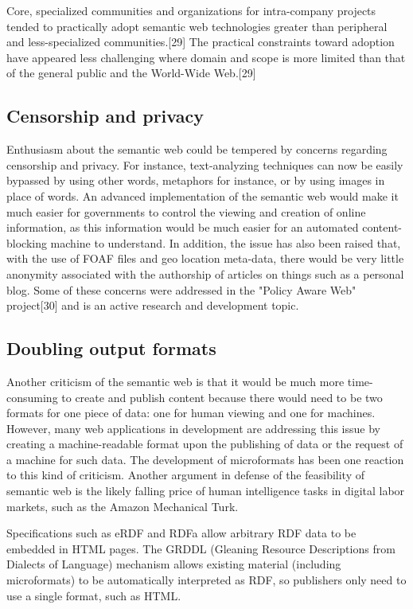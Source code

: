 Core, specialized communities and organizations for intra-company projects tended to practically adopt semantic web technologies greater than peripheral and less-specialized communities.[29] The practical constraints toward adoption have appeared less challenging where domain and scope is more limited than that of the general public and the World-Wide Web.[29]


\subsection{Censorship and privacy}

Enthusiasm about the semantic web could be tempered by concerns regarding censorship and privacy. For instance, text-analyzing techniques can now be easily bypassed by using other words, metaphors for instance, or by using images in place of words. An advanced implementation of the semantic web would make it much easier for governments to control the viewing and creation of online information, as this information would be much easier for an automated content-blocking machine to understand. In addition, the issue has also been raised that, with the use of FOAF files and geo location meta-data, there would be very little anonymity associated with the authorship of articles on things such as a personal blog. Some of these concerns were addressed in the "Policy Aware Web" project[30] and is an active research and development topic.

\subsection{Doubling output formats}

Another criticism of the semantic web is that it would be much more time-consuming to create and publish content because there would need to be two formats for one piece of data: one for human viewing and one for machines. However, many web applications in development are addressing this issue by creating a machine-readable format upon the publishing of data or the request of a machine for such data. The development of microformats has been one reaction to this kind of criticism. Another argument in defense of the feasibility of semantic web is the likely falling price of human intelligence tasks in digital labor markets, such as the Amazon Mechanical Turk.

Specifications such as eRDF and RDFa allow arbitrary RDF data to be embedded in HTML pages. The GRDDL (Gleaning Resource Descriptions from Dialects of Language) mechanism allows existing material (including microformats) to be automatically interpreted as RDF, so publishers only need to use a single format, such as HTML.


